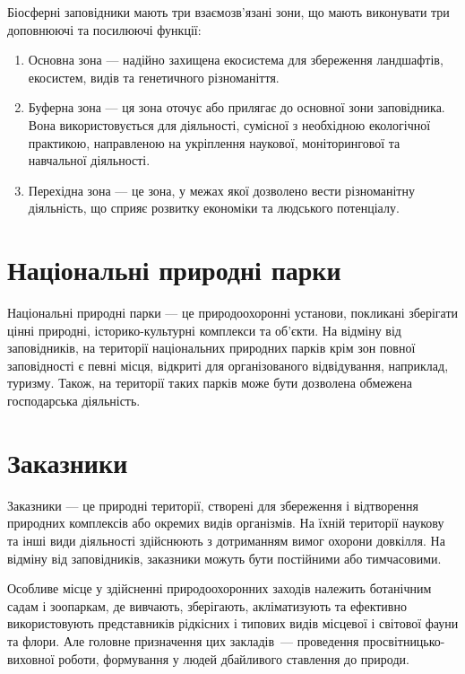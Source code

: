 \documentclass[a4paper,oneside,DIV=10,12pt]{scrreprt}
\begin{document}
				Біосферні заповідники мають три взаємо\-зв'я\-за\-ні зони, що мають виконувати три доповнюючі та посилюючі функції:
				\begin{enumerate}
					\item Основна зона --- надійно захищена екосистема для збереження ландшафтів, екосистем, видів та генетичного різноманіття.
					\item Буферна зона --- ця зона оточує або прилягає до основної зони заповідника. Вона використовується для діяльності, сумісної з необхідною екологічної практикою, направленою на укріплення наукової, моніторингової та навчальної діяльності.
					\item Перехідна зона --- це зона, у межах якої дозволено вести різноманітну діяльність, що сприяє розвитку економіки та людського потенціалу.
				\end{enumerate}
				
		\section{Національні природні парки}
			Національні природні парки --- це природоохоронні установи, покликані зберігати цінні природні, історико-культурні комплекси та об'єкти. На відміну від заповідників, на території національних природних парків крім зон повної заповідності є певні місця, відкриті для організованого відвідування, наприклад, туризму. Також, на території таких парків може бути дозволена обмежена господарська діяльність.
			
		\section{Заказники}
			Заказники --- це природні території, створені для збереження і відтворення природних комплексів або окремих видів організмів. На їхній території наукову та інші види діяльності здійснюють з дотриманням вимог охорони довкілля. На відміну від заповідників, заказники можуть бути постійними або тимчасовими.
			
			Особливе місце у здійсненні природоохоронних заходів належить ботанічним садам і зоопаркам, де вивчають, зберігають, акліматизують та ефективно використовують представників рідкісних і типових видів місцевої і світової фауни та флори. Але головне призначення цих закладів~--- проведення просвітницько-виховної роботи, формування у людей дбайливого ставлення до природи.
\end{document}
